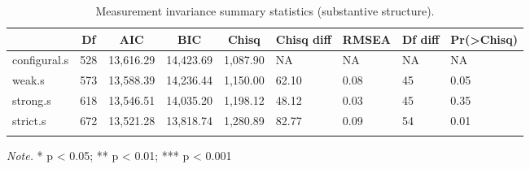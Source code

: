 \documentclass[
  man]{apa7}
\begin{document}
\begin{table}[tbp]

\begin{center}
\begin{threeparttable}

\caption{\label{tab:measinv.pilot.sub}Measurement invariance summary statistics (substantive structure).}

\begin{tabular}{lllllllll}
\toprule
 & \multicolumn{1}{c}{Df} & \multicolumn{1}{c}{AIC} & \multicolumn{1}{c}{BIC} & \multicolumn{1}{c}{Chisq} & \multicolumn{1}{c}{Chisq diff} & \multicolumn{1}{c}{RMSEA} & \multicolumn{1}{c}{Df diff} & \multicolumn{1}{c}{Pr(>Chisq)}\\
\midrule
configural.s & 528 & 13,616.29 & 14,423.69 & 1,087.90 & NA & NA & NA & NA\\
weak.s & 573 & 13,588.39 & 14,236.44 & 1,150.00 & 62.10 & 0.08 & 45 & 0.05\\
strong.s & 618 & 13,546.51 & 14,035.20 & 1,198.12 & 48.12 & 0.03 & 45 & 0.35\\
strict.s & 672 & 13,521.28 & 13,818.74 & 1,280.89 & 82.77 & 0.09 & 54 & 0.01\\
\bottomrule
\addlinespace
\end{tabular}

\begin{tablenotes}[para]
\normalsize{\textit{Note.} * p < 0.05; ** p < 0.01; *** p < 0.001}
\end{tablenotes}

\end{threeparttable}
\end{center}

\end{table}
\end{document}
